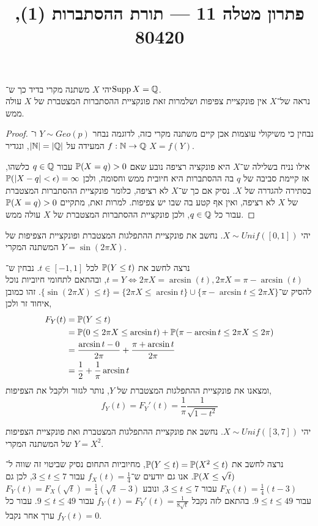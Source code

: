
\title{פתרון מטלה 11 --- תורת ההסתברות (1), 80420}

\DeclareMathOperator{\Supp}{Supp}


\maketitle
\maketitleprint{}

\question{}
יהי $X$ משתנה מקרי בדיד כך ש־$\operatorname{Supp} X = \mathbb{Q}$. \\
נראה של־$X$ אין פונקציית צפיפות ושלמרות זאת פונקציית ההסתברות המצטברת של $X$ עולה ממש.
\begin{proof}
	נבחין כי משיקולי עוצמות אכן קיים משתנה מקרי כזה, לדוגמה נבחר $Y \sim Geo(p)$ ו־$f : \mathbb{N} \to \mathbb{Q}$ המעידה על $|\mathbb{N}| = |\mathbb{Q}|$, ונגדיר $X = f(Y)$.

	אילו נניח בשלילה ש־$X$ היא פונקציה רציפה נובע שאם $\mathbb{P}(X = q) > 0$ עבור $q \in \mathbb{Q}$ כלשהו, אז קיימת סביבה של $q$ בה ההסתברות היא חיובית ממש וחסומה, ולכן $\mathbb{P}(|X - q| < \epsilon) = \infty$ בסתירה להגדרה של $X$.
	נסיק אם כך ש־$X$ לא רציפה, כלומר פונקציית ההסתברות המצטברת של $X$ לא רציפה, ואין אף קטע בה שבו יש צפיפות.
	למרות זאת, מתקיים $\mathbb{P}(X = q) > 0$ עבור כל $q \in \mathbb{Q}$, ולכן פונקציית ההסתברות המצטברת של $X$ עולה ממש.
\end{proof}

\question{}
יהי $X \sim Unif([0, 1])$.
נחשב את פונקציית ההתפלגות המצטברת ופונקציית הצפיפות של המשתנה המקרי $Y = \sin(2\pi X)$.
\begin{solution}
	נרצה לחשב את $\mathbb{P}(Y \le t)$ לכל $t \in [-1, 1]$.
	נבחין ש־$t = Y \iff 2\pi X = \arcsin(t), 2\pi X = \pi - \arcsin(t)$, ובהתאם לתחומי חיוביות נוכל להסיק ש־$\{ \sin(2\pi X) \le t \} = \{ 2\pi X \le \arcsin t \} \cup \{ \pi - \arcsin t \le 2\pi X \}$.
	זהו כמובן איחוד זר ולכן,
	\begin{align*}
		F_Y(t)
		& = \mathbb{P}(Y \le t) \\
		& = \mathbb{P}(0 \le 2\pi X \le \arcsin t) + \mathbb{P}(\pi - \arcsin t \le 2\pi X \le 2\pi) \\
		& = \frac{\arcsin t - 0}{2\pi} + \frac{\pi + \arcsin t}{2\pi} \\
		& = \frac{1}{2} + \frac{1}{\pi} \arcsin t
	\end{align*}
	ומצאנו את פונקציית ההתפלגות המצטברת של $Y$, נותר לגזור ולקבל את הצפיפות,
	\[
		f_Y(t)
		= F_Y'(t)
		= \frac{1}{\pi} \frac{1}{\sqrt{1 - t^2}}
	\]
\end{solution}

\question{}
יהי $X \sim Unif([3, 7])$.
נחשב את פונקציית ההתפלגות המצטברת ואת פונקציית הצפיפות של המשתנה המקרי $Y = X^2$.
\begin{solution}
	נרצה לחשב את $\mathbb{P}(Y \le t) = \mathbb{P}(X^2 \le t)$, מחיוביות התחום נסיק שביטוי זה שווה ל־$\mathbb{P}(X \le \sqrt{t})$.
	אנו גם יודעים ש־$f_X(t) = \frac{1}{4}$ עבור $3 \le t \le 7$, לכן גם $F_X(t) = \frac{1}{4}(t - 3)$ עבור $3 \le t \le 7$, ונובע $F_Y(t) = F_X(\sqrt{t}) = \frac{1}{4}(\sqrt{t} - 3)$ עבור $9 \le t \le 49$.
	בהתאם לזה נקבל $f_Y(t) = F_Y'(t) = \frac{1}{8\sqrt{t}}$ עבור $9 \le t \le 49$.
	עבור כל ערך אחר נקבל $f_Y(t) = 0$.
\end{solution}

